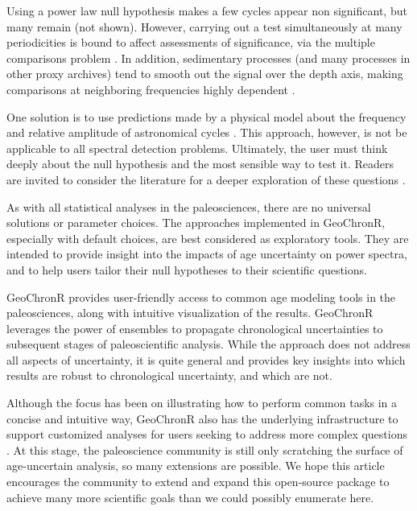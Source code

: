 \documentclass[gchron, manuscript]{copernicus}
\begin{document}
Using a power law null hypothesis makes a few cycles appear non significant, but many remain (not shown).
However, carrying out a test simultaneously at many periodicities is bound to affect assessments of significance, via the multiple comparisons problem \citep{Vaughan_PP2011}. In addition, sedimentary processes (and many processes in other proxy archives) tend to smooth out the signal over the depth axis, making comparisons at neighboring frequencies highly dependent \citep{Meyers_2012}.

One solution is to use predictions made by a physical model about the frequency and relative amplitude of astronomical cycles \citep{MeyersSageman_2007}. This approach, however, is not be applicable to all spectral detection problems. Ultimately, the user must think deeply about the null hypothesis and the most sensible way to test it. Readers are invited to consider the literature for a deeper exploration of these questions \citep[e.g.,][]{Vaughan_PP2011, Meyers_2012, Meyers_2015, MeyersMalinverno2018}.

As with all statistical analyses in the paleosciences, there are no universal solutions or parameter choices.
The approaches implemented in GeoChronR, especially with default choices, are best considered as exploratory tools. They are intended to provide insight into the impacts of age uncertainty on power spectra, and to help users tailor their null hypotheses to their scientific questions.

\conclusions

GeoChronR provides user-friendly access to common age modeling tools in the paleosciences, along with intuitive visualization of the results. GeoChronR leverages the power of ensembles to propagate chronological uncertainties to subsequent stages of paleoscientific analysis. While the approach does not address all aspects of uncertainty, it is quite general and provides key insights into which results are robust to chronological uncertainty, and which are not.

Although the focus has been on illustrating how to perform common tasks in a concise and intuitive way, GeoChronR also has the underlying infrastructure to support customized analyses for users seeking to address more complex questions \citep[e.g.][]{thomas2018sikuiui}. At this stage, the paleoscience community is still only scratching the surface of age-uncertain analysis, so many extensions are possible. We hope this article encourages the community to extend and expand this open-source package to achieve many more scientific goals than we could possibly enumerate here.
\end{document}
